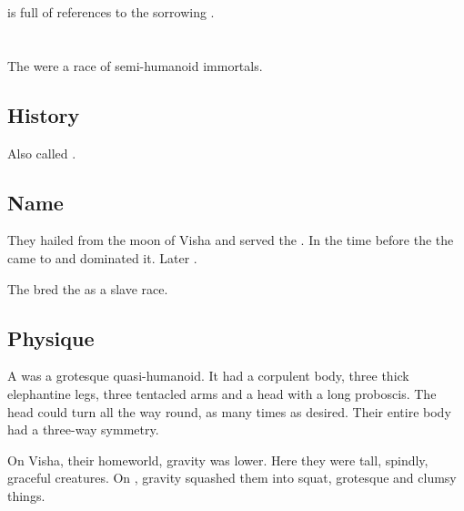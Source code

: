 \WanderersInDarknessEmph is full of references to the sorrowing \nymphs. 
















\section[Shugul]{\Shugul}
\index{\shugul}
The \shuguls were a race of semi-humanoid immortals. 









\subsection{History}
Also called \quo{\moonthings}. 









\subsection{Name}
They hailed from the moon of Visha and served the \moongods.
In the time before the \ophidians the \shugul came to \Miith and dominated it.
Later . 

The \shugul bred the  as a slave race.









\subsection{Physique}
A \shugul was a grotesque quasi-humanoid.
It had a corpulent body, three thick elephantine legs, three tentacled arms and a head with a long proboscis.
The head could turn all the way round, as many times as desired.
Their entire body had a three-way symmetry.

On Visha, their homeworld, gravity was lower.
Here they were tall, spindly, graceful creatures.
On \Miith, gravity squashed them into squat, grotesque and clumsy things. 

